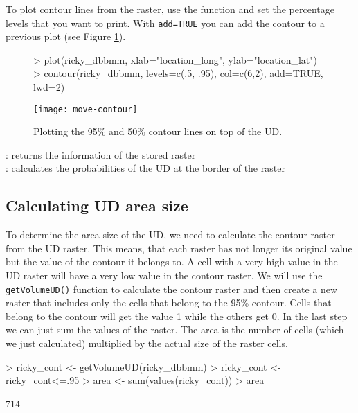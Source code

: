 \documentclass[article,nojss]{jss}
\newcommand{\fct}[1]{{\code{#1()}}}
\begin{document}
To plot contour lines from the raster, use the \fct{contour} function and set the percentage levels that you want to print. With \texttt{add=TRUE} you can add the contour to a previous plot (see Figure \ref{fig:three}). \\

\begin{figure}
\begin{center}
\begin{Schunk}
\begin{Sinput}
> plot(ricky_dbbmm, xlab="location_long", ylab="location_lat")
> contour(ricky_dbbmm, levels=c(.5, .95), col=c(6,2), add=TRUE, lwd=2)
\end{Sinput}
\end{Schunk}
\texttt{[image: move-contour]}
\end{center}
\caption{Plotting the 95\% and 50\% contour lines on top of the UD.}
\label{fig:three}
\end{figure}

\fct{raster}              : returns the information of the stored raster\\
\fct{outerProbability}    : calculates the probabilities of the UD at the border of the raster\\


\subsection{Calculating UD area size}
To determine the area size of the UD, we need to calculate the contour raster from the UD raster. This means, that each raster has not longer its original value but the value of the contour it belongs to. A cell with a very high value in the UD raster will have a very low value in the contour raster. We will use the \texttt{getVolumeUD()} function to calculate the contour raster and then create a new raster that includes only the cells that belong to the 95\% contour. Cells that belong to the contour will get the value 1 while the others get 0. In the last step we can just sum the values of the raster. The area is the number of cells (which we just calculated) multiplied by the actual size of the raster cells. 

\begin{Schunk}
\begin{Sinput}
> ricky_cont <- getVolumeUD(ricky_dbbmm)
> ricky_cont <- ricky_cont<=.95
> area <- sum(values(ricky_cont))
> area
\end{Sinput}
\begin{Soutput}
[1] 714
\end{Soutput}
\end{Schunk}
\end{document}
